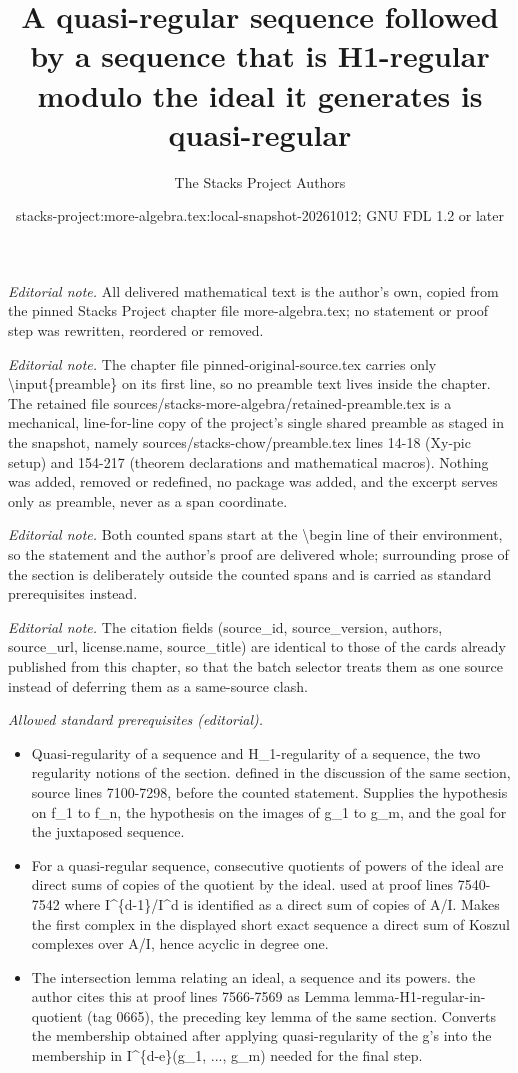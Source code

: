 \documentclass[10pt,a4paper]{amsart}
\title{A quasi-regular sequence followed by a sequence that is H1-regular modulo the ideal it generates is quasi-regular}
\author{The Stacks Project Authors}
\date{stacks-project:more-algebra.tex:local-snapshot-20261012; GNU FDL 1.2 or later}
\theoremstyle{plain}
\theoremstyle{definition}
\theoremstyle{remark}
\numberwithin{equation}{subsection}
\begin{document}
\maketitle
\setcounter{subsection}{1}
\noindent\textit{Editorial note.} All delivered mathematical text is the author's own, copied from the pinned Stacks Project chapter file more-algebra.tex; no statement or proof step was rewritten, reordered or removed.\par\medskip
\noindent\textit{Editorial note.} The chapter file pinned-original-source.tex carries only \textbackslash{}input\{preamble\} on its first line, so no preamble text lives inside the chapter. The retained file sources/stacks-more-algebra/retained-preamble.tex is a mechanical, line-for-line copy of the project's single shared preamble as staged in the snapshot, namely sources/stacks-chow/preamble.tex lines 14-18 (Xy-pic setup) and 154-217 (theorem declarations and mathematical macros). Nothing was added, removed or redefined, no package was added, and the excerpt serves only as preamble, never as a span coordinate.\par\medskip
\noindent\textit{Editorial note.} Both counted spans start at the \textbackslash{}begin line of their environment, so the statement and the author's proof are delivered whole; surrounding prose of the section is deliberately outside the counted spans and is carried as standard prerequisites instead.\par\medskip
\noindent\textit{Editorial note.} The citation fields (source\_id, source\_version, authors, source\_url, license.name, source\_title) are identical to those of the cards already published from this chapter, so that the batch selector treats them as one source instead of deferring them as a same-source clash.\par\medskip
\noindent\textit{Allowed standard prerequisites (editorial).}\begin{itemize}
\item Quasi-regularity of a sequence and H\_1-regularity of a sequence, the two regularity notions of the section. defined in the discussion of the same section, source lines 7100-7298, before the counted statement. Supplies the hypothesis on f\_1 to f\_n, the hypothesis on the images of g\_1 to g\_m, and the goal for the juxtaposed sequence.
\item For a quasi-regular sequence, consecutive quotients of powers of the ideal are direct sums of copies of the quotient by the ideal. used at proof lines 7540-7542 where I\textasciicircum{}\{d-1\}/I\textasciicircum{}d is identified as a direct sum of copies of A/I. Makes the first complex in the displayed short exact sequence a direct sum of Koszul complexes over A/I, hence acyclic in degree one.
\item The intersection lemma relating an ideal, a sequence and its powers. the author cites this at proof lines 7566-7569 as Lemma lemma-H1-regular-in-quotient (tag 0665), the preceding key lemma of the same section. Converts the membership obtained after applying quasi-regularity of the g's into the membership in I\textasciicircum{}\{d-e\}(g\_1, ..., g\_m) needed for the final step.
\end{itemize}\medskip
\end{document}
